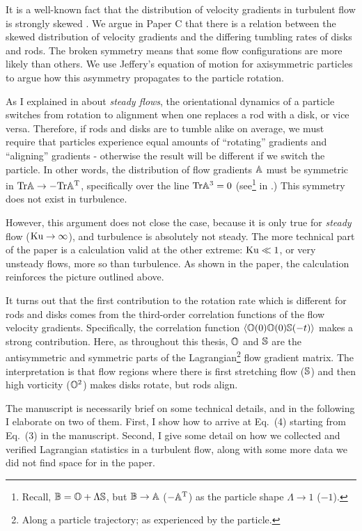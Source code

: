 \documentclass[thesis.tex]{subfiles}
\begin{document}
It is a well-known fact that the distribution of velocity gradients in turbulent flow is strongly skewed \cite{chertkov1999,luthi2009}. We argue in Paper C that there is a relation between the skewed distribution of velocity gradients and the differing tumbling rates of disks and rods. The broken symmetry means that some flow configurations are more likely than others. We use Jeffery's equation of motion for axisymmetric particles to argue how this asymmetry propagates to the particle rotation. 

As I explained in  about \emph{steady flows}, the orientational dynamics of a particle switches from rotation to alignment when one replaces a rod with a disk, or vice versa. Therefore, if rods and disks are to tumble alike on average, we must require that particles experience equal amounts of ``rotating'' gradients and ``aligning'' gradients - otherwise the result will be different if we switch the particle.
In other words, the distribution of flow gradients $\mathbb{A}$ must be symmetric in $\mbox{Tr} \mathbb{A} \to -\mbox{Tr} \mathbb{A}^{\mathrm T}$, specifically over the line $\mbox{Tr} \mathbb{A}^3=0$ (see\footnote{Recall, $\mathbb{B}=\mathbb{O} + \Lambda\mathbb{S}$, but $\mathbb{B} \to \mathbb{A}$ ($-\mathbb{A}^{\mathrm T}$) as the particle shape $\Lambda\to 1$ ($-1$).}  in .) This symmetry does not exist in turbulence.

However, this argument does not close the case, because it is only true for \emph{steady} flow ($\mbox{Ku}\to\infty$), and turbulence is absolutely not steady. The more technical part of the paper is a calculation valid at the other extreme: $\mbox{Ku} \ll 1$, or very unsteady flows, more so than turbulence. As shown in the paper, the calculation reinforces the picture outlined above.

It turns out that the first contribution to the rotation rate which is different for rods and disks comes from the third-order correlation functions of the flow velocity gradients. Specifically, the correlation function $\langle \mathbb{O}(0) \mathbb{O}(0) \mathbb{S}(-t)\rangle$ makes a strong contribution. Here, as throughout this thesis, $\mathbb{O}$ and $\mathbb{S}$ are the antisymmetric and symmetric parts of the Lagrangian\footnote{Along a particle trajectory; as experienced by the particle.} flow gradient matrix. The interpretation is that flow regions where there is first stretching flow ($\mathbb{S}$) and then high vorticity ($\mathbb{O}^2$) makes disks rotate, but rods align.

The manuscript is necessarily brief on some technical details, and in the following I elaborate on two of them. First, I show how to arrive at Eq.~(4) starting from Eq.~(3) in the manuscript. Second, I give some detail on how we collected and verified Lagrangian statistics in a turbulent flow, along with some more data we did not find space for in the paper.
\end{document}
